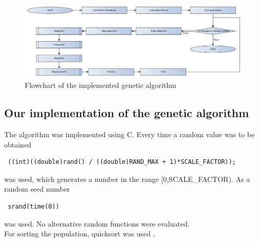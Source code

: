 \begin{figure}[!h]
	\centering
	\includegraphics[width=\textwidth]{chapter_4_methods/GeneticFlowChart-Algorithm.jpg}
  	\caption[Flowchart of the implemented genetic algorithm]
  	{Flowchart of the implemented genetic algorithm}
\end{figure}
\subsection{Our implementation of the genetic algorithm}
The algorithm was implemented using C. Every time a random value was to be obtained \begin{verbatim} ((int)((double)rand() / ((double)RAND_MAX + 1)*SCALE_FACTOR)); \end{verbatim} was used, which generates a number in the range [0,SCALE\_FACTOR). As a random seed number \begin{verbatim} srand(time(0))\end{verbatim} was used. No alternative random functions were evaluated.\\
For sorting the population, quicksort was used \cite{quicksort}.\\